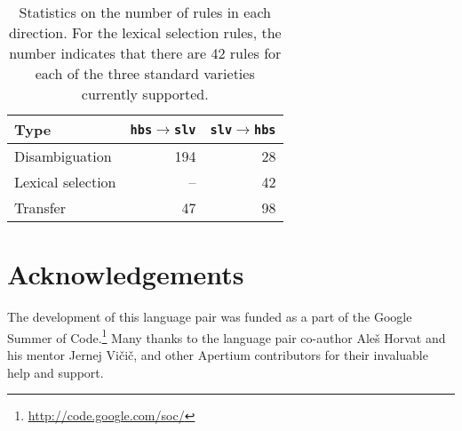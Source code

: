 \documentclass[11pt]{article}
\begin{document}
\begin{table}
\begin{center}
\begin{tabular}{|l|rr|}
\hline
 \textbf{Type}      & \texttt{hbs}$\rightarrow$\texttt{slv} & \texttt{slv}$\rightarrow$\texttt{hbs}\\
\hline
Disambiguation      &     194              &     28 \\
Lexical selection   &     --            &  42 \\
Transfer            &                47 &  98 \\
\hline

\end{tabular}
 \caption{Statistics on the number of rules in each direction. For the lexical selection rules, 
   the number indicates that there are 42 rules for each of the three standard varieties currently
   supported.}
\end{center}
\end{table}







\section*{Acknowledgements}

The development of this language pair was funded as a part of the
Google Summer of Code.\footnote{\url{http://code.google.com/soc/}}
Many thanks to the language pair co-author Ale\v{s} Horvat and his
mentor Jernej Vičič, and other Apertium contributors for their
invaluable help and support.

%


\end{document}
